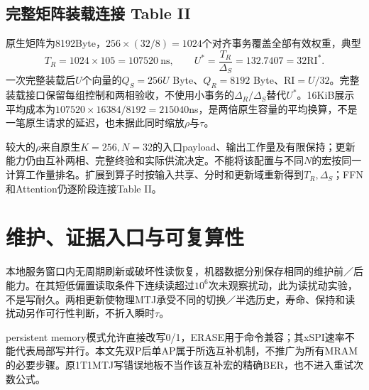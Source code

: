 \subsection{完整矩阵装载连接 Table II}
原生矩阵为8192Byte，$256\times(32/8)=1024$个对齐事务覆盖全部有效权重，典型
\[
T_R=1024\times105=107520\ \mathrm{ns},\qquad
U^*=\frac{T_R}{\Delta_S}=132.7407=32\mathrm{RI}^*.
\]
一次完整装载后$U$个向量的$Q_S=256U$ Byte、$Q_R=8192$ Byte、$\mathrm{RI}=U/32$。完整装载接口保留每组控制和两相验收，不使用小事务的$\Delta_R/\Delta_S$替代$U^*$。16KiB展示平均成本为$107520\times16384/8192=215040$ns，是两倍原生容量的平均换算，不是一笔原生请求的延迟，也未据此同时缩放$\rho$与$\tau$。

较大的$\rho$来自原生$K=256,N=32$的入口payload、输出工作量及有限保持；更新能力仍由互补两相、完整终验和实际供流决定。不能将该配置与不同$N$的宏按同一计算工作量排名。扩展到算子时按输入共享、分时和更新域重新得到$T_R,\Delta_S$；FFN和Attention仍逐阶段连接Table II。

\clearpage
\section{维护、证据入口与可复算性}

本地服务窗口内无周期刷新或破坏性读恢复，机器数据分别保存相同的维护前／后能力。在其短低偏置读取条件下连续读超过$10^6$次未观察扰动，此为读扰动实验，不是写耐久。两相更新使物理MTJ承受不同的切换／半选历史，寿命、保持和读扰动另作可行性判断，不折入瞬时$\tau$。

 persistent memory模式允许直接改写0/1，ERASE用于命令兼容；其xSPI速率不能代表局部写并行。本文先双P后单AP属于所选互补机制，不推广为所有MRAM的必要步骤。原1T1MTJ写错误地板不当作该互补宏的精确BER，也不进入重试次数公式。

